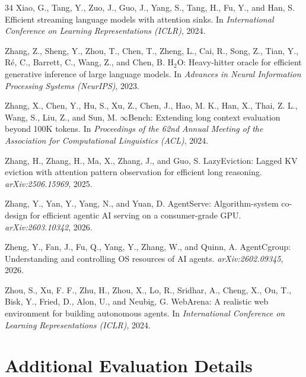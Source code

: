 \documentclass{article}
\begin{document}
\begin{thebibliography}{34}
Xiao, G., Tang, Y., Zuo, J., Guo, J., Yang, S., Tang, H., Fu, Y.,
  and Han, S.
\newblock Efficient streaming language models with attention sinks.
\newblock In \emph{International Conference on Learning Representations
  (ICLR)}, 2024.

Zhang, Z., Sheng, Y., Zhou, T., Chen, T., Zheng, L., Cai, R., Song, Z.,
  Tian, Y., R{\'e}, C., Barrett, C., Wang, Z., and Chen, B.
\newblock H$_2$O: Heavy-hitter oracle for efficient generative inference
  of large language models.
\newblock In \emph{Advances in Neural Information Processing Systems
  (NeurIPS)}, 2023.

Zhang, X., Chen, Y., Hu, S., Xu, Z., Chen, J., Hao, M. K., Han, X.,
  Thai, Z. L., Wang, S., Liu, Z., and Sun, M.
\newblock $\infty$Bench: Extending long context evaluation beyond 100K
  tokens.
\newblock In \emph{Proceedings of the 62nd Annual Meeting of the
  Association for Computational Linguistics (ACL)}, 2024.

Zhang, H., Zhang, H., Ma, X., Zhang, J., and Guo, S.
\newblock LazyEviction: Lagged KV eviction with attention pattern
  observation for efficient long reasoning.
\newblock \emph{arXiv:2506.15969}, 2025.

Zhang, Y., Yan, Y., Yang, N., and Yuan, D.
\newblock AgentServe: Algorithm-system co-design for efficient agentic
  AI serving on a consumer-grade GPU.
\newblock \emph{arXiv:2603.10342}, 2026.

Zheng, Y., Fan, J., Fu, Q., Yang, Y., Zhang, W., and Quinn, A.
\newblock AgentCgroup: Understanding and controlling OS resources of AI
  agents.
\newblock \emph{arXiv:2602.09345}, 2026.

Zhou, S., Xu, F. F., Zhu, H., Zhou, X., Lo, R., Sridhar, A.,
  Cheng, X., Ou, T., Bisk, Y., Fried, D., Alon, U., and Neubig, G.
\newblock WebArena: A realistic web environment for building autonomous
  agents.
\newblock In \emph{International Conference on Learning
  Representations (ICLR)}, 2024.

\end{thebibliography}

\newpage
\appendix
\onecolumn
\raggedbottom

\section{Additional Evaluation Details}
\label{app:evaluation-details}
\end{document}
